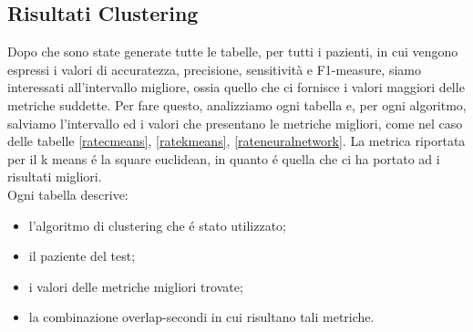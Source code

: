 \begin{table}[htp]
	\centering
	\caption{Esempio di tabelle delle prestazioni del clustering}
	\label{ratecluster3}
\end{table}
\subsection{Risultati Clustering}
Dopo che sono state generate tutte le tabelle, per tutti i pazienti, in cui vengono espressi i valori di accuratezza, precisione, sensitività e F1-measure, siamo interessati all'intervallo migliore, ossia quello che ci fornisce i valori maggiori delle metriche suddette. Per fare questo, analizziamo ogni tabella e, per ogni algoritmo, salviamo l'intervallo ed i valori che presentano le metriche migliori, come nel caso delle tabelle \ref{ratecmeans}, \ref{ratekmeans}, \ref{rateneuralnetwork}. La metrica riportata per il k means é la square euclidean, in quanto é quella che ci ha portato ad i risultati migliori. \\
Ogni tabella descrive:
\begin{itemize}
	\item l'algoritmo di clustering che é stato utilizzato;
	\item il paziente del test;
	\item i valori delle metriche migliori trovate;
	\item la combinazione overlap-secondi in cui risultano tali metriche.
\end{itemize}

